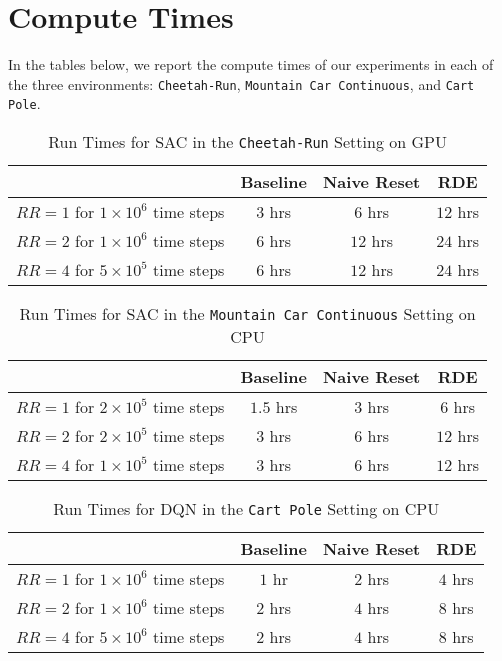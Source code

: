 \documentclass[base]{subfiles}
\begin{document}
\section{Compute Times} \label{app:d}

In the tables below, we report the compute times of our experiments in each of the three environments: \texttt{Cheetah-Run}, \texttt{Mountain Car Continuous}, and \texttt{Cart Pole}.

\begin{table}[h]
    \caption{Run Times for SAC in the \texttt{Cheetah-Run} Setting on GPU}
    \label{tab:cheetah_times}
    \centering
    \begin{tabular}{cccc}
        \toprule
        & Baseline & Naive Reset & RDE \\
        \hline
        $RR=1$ for $1 \times 10^6$ time steps & $3$ hrs & $6$ hrs & $12$ hrs \\
        \hline 
        $RR=2$ for $1 \times 10^6$ time steps & $6$ hrs & $12$ hrs & $24$ hrs \\
        \hline
        $RR=4$ for $5 \times 10^5$ time steps & $6$ hrs & $12$ hrs & $24$ hrs \\
        \bottomrule
    \end{tabular}
\end{table}

\begin{table}[h]
    \caption{Run Times for SAC in the \texttt{Mountain Car Continuous} Setting on CPU}
    \label{tab:mc_times}
    \centering
    \begin{tabular}{cccc}
        \toprule
        & Baseline & Naive Reset & RDE \\
        \hline
        $RR=1$ for $2 \times 10^5$ time steps & $1.5$ hrs & $3$ hrs & $6$ hrs \\
        \hline 
        $RR=2$ for $2 \times 10^5$ time steps & $3$ hrs & $6$ hrs & $12$ hrs \\
        \hline
        $RR=4$ for $1 \times 10^5$ time steps & $3$ hrs & $6$ hrs & $12$ hrs \\
        \bottomrule
    \end{tabular}
\end{table}

\begin{table}[h]
    \caption{Run Times for DQN in the \texttt{Cart Pole} Setting on CPU}
    \label{tab:cp_times}
    \centering
    \begin{tabular}{c|c|c|c}
        \toprule
        & Baseline & Naive Reset & RDE \\
        \hline
        $RR=1$ for $1 \times 10^6$ time steps & $1$ hr & $2$ hrs & $4$ hrs \\
        \hline 
        $RR=2$ for $1 \times 10^6$ time steps & $2$ hrs & $4$ hrs & $8$ hrs \\
        \hline
        $RR=4$ for $5 \times 10^6$ time steps & $2$ hrs & $4$ hrs & $8$ hrs \\
        \bottomrule
    \end{tabular}
\end{table}
\end{document}
